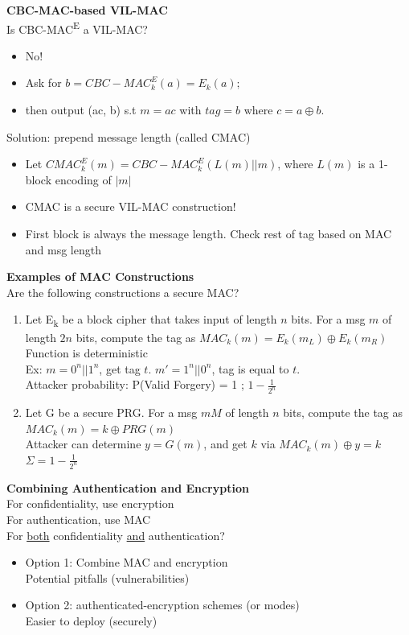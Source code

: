 \documentclass{article}
\begin{document}
\noindent \textbf{CBC-MAC-based VIL-MAC}\\
Is CBC-MAC\textsuperscript{E} a VIL-MAC?
\begin{itemize}
	\item No!
	\item Ask for $b=CBC-MAC^E_k(a)=E_k(a);$
	\item then output (ac, b) s.t $m = ac$ with $tag = b$ where $c = a\oplus b$.
\end{itemize}
Solution: prepend message length (called CMAC)
\begin{itemize}
	\item Let $CMAC^E_k(m) = CBC-MAC^E_k(L(m)||m)$, where $L(m)$ is a 1-block encoding of $|m|$
	\item CMAC is a secure VIL-MAC construction!
	\item First block is always the message length. Check rest of tag based on MAC and msg length
\end{itemize}
\textbf{Examples of MAC Constructions}\\
Are the following constructions a secure MAC?
\begin{enumerate}
	\item Let E\textsubscript{k} be a block cipher that takes input of length $n$ bits. For a msg $m$ of length $2n$ bits, compute the tag as $MAC_k(m) = E_k(m_L) \oplus  E_k(m_R)$\\
		Function is deterministic\\
		Ex: $m=0^n||1^n$, get tag $t$. $m'=1^n||0^n$, tag is equal to $t$.\\
		Attacker probability: P(Valid Forgery) = 1 ; $1-\frac{1}{2^n}$
	\item Let G be a secure PRG. For a msg $mM$ of length $n$ bits, compute the tag as $MAC_k(m) = k \oplus  PRG(m)$\\
		Attacker can determine $y=G(m)$, and get $k$ via $MAC_k(m) \oplus  y = k$\\
		$\Sigma = 1 - \frac{1}{2^n}$
\end{enumerate}
\textbf{Combining Authentication and Encryption}\\
For confidentiality, use encryption\\
For authentication, use MAC\\
For \underline{both} confidentiality \underline{and} authentication?
\begin{itemize}
	\item Option 1: Combine MAC and encryption\\
		Potential pitfalls (vulnerabilities)
	\item Option 2: authenticated-encryption schemes (or modes)\\
		Easier to deploy (securely)
\end{itemize}
\end{document}
